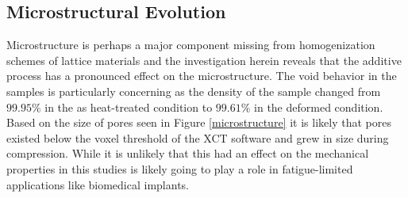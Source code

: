 \subsection{Microstructural Evolution}
Microstructure is perhaps a major component missing from homogenization schemes of lattice materials and the investigation herein reveals that the additive process has a pronounced effect on the microstructure. The void behavior in the samples is particularly concerning as the density of the sample changed from $99.95\%$ in the as heat-treated condition to $99.61\%$ in the deformed condition. Based on the size of pores seen in Figure \ref{microstructure} it is likely that pores existed below the voxel threshold of the XCT software and grew in size during compression. While it is unlikely that this had an effect on the mechanical properties in this studies is likely going to play a role in fatigue-limited applications like biomedical implants.

